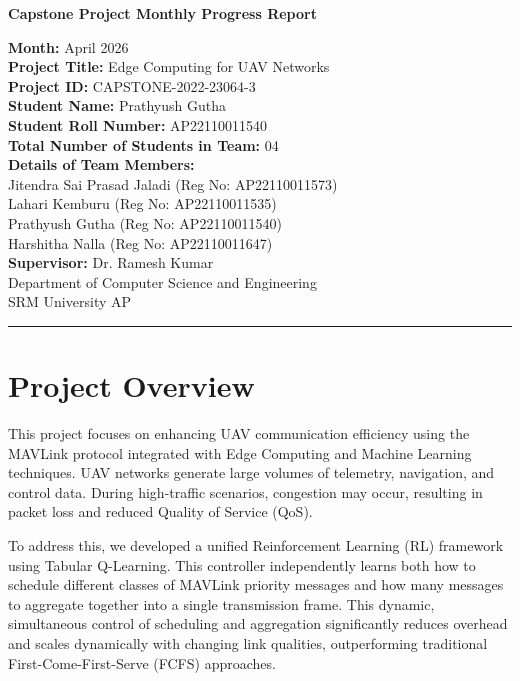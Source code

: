 \documentclass[12pt,a4paper]{article}
\begin{document}
\begin{center}
    \Large \textbf{Capstone Project Monthly Progress Report}\\[0.5cm]
    \normalsize
    
    \textbf{Month:} April 2026 \\[0.5cm]
    \textbf{Project Title:} Edge Computing for UAV Networks \\[0.5cm]
    \textbf{Project ID:} CAPSTONE-2022-23064-3 \\[0.5cm]
    \textbf{Student Name:} Prathyush Gutha \\
    \textbf{Student Roll Number:} AP22110011540\\[0.3cm]

    \textbf{Total Number of Students in Team:} 04 \\
    \textbf{Details of Team Members:}\\
    Jitendra Sai Prasad Jaladi (Reg No: AP22110011573)\\
    Lahari Kemburu (Reg No: AP22110011535)\\
    Prathyush Gutha (Reg No: AP22110011540)\\
    Harshitha Nalla (Reg No: AP22110011647)\\[0.5cm]
    
    \textbf{Supervisor:} Dr. Ramesh Kumar\\[0.5cm]
    Department of Computer Science and Engineering\\
    SRM University AP
\end{center}

\hrule
\vspace{1cm}

\section{Project Overview}
This project focuses on enhancing UAV communication efficiency using the MAVLink protocol integrated with Edge Computing and Machine Learning techniques. UAV networks generate large volumes of telemetry, navigation, and control data. During high-traffic scenarios, congestion may occur, resulting in packet loss and reduced Quality of Service (QoS). 

To address this, we developed a unified Reinforcement Learning (RL) framework using Tabular Q-Learning. This controller independently learns both how to schedule different classes of MAVLink priority messages and how many messages to aggregate together into a single transmission frame. This dynamic, simultaneous control of scheduling and aggregation significantly reduces overhead and scales dynamically with changing link qualities, outperforming traditional First-Come-First-Serve (FCFS) approaches.
\end{document}

